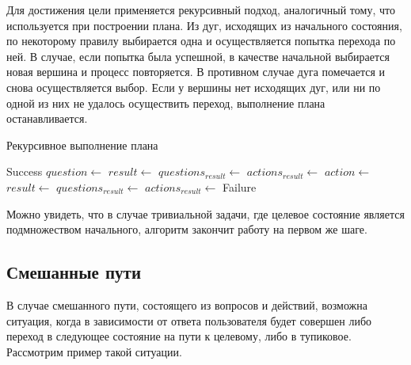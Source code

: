 Для достижения цели применяется рекурсивный подход, аналогичный тому, что используется при построении плана. Из дуг, исходящих из начального состояния, по некоторому правилу выбирается одна и осуществляется попытка перехода по ней. В случае, если попытка была успешной, в качестве начальной выбирается новая вершина и процесс повторяется. В противном случае дуга помечается и снова осуществляется выбор. Если у вершины нет исходящих дуг, или ни по одной из них не удалось осуществить переход, выполнение плана останавливается.

\begin{algorithm}
 \caption{Рекурсивное выполнение плана}
 \begin{algorithmic}
      \State \Return Success
    \EndIf
      \State $question \gets$ 
      \State $result \gets$ 
	\State $questions_{result} \gets$
	\State $actions_{result} \gets$
	\State {}
      \Else
	\State {}
      \EndIf
      \State $action \gets$ 
      \State $result \gets$ 
	\State $questions_{result} \gets$
	\State $actions_{result} \gets$
	\State {}
      \Else
	\State {}
      \EndIf
    \Else 
      \State \Return Failure
    \EndIf
  \EndFunction
 \end{algorithmic}
\end{algorithm}

Можно увидеть, что в случае тривиальной задачи, где целевое состояние является подмножеством начального, алгоритм закончит работу на первом же шаге.

\subsection{Смешанные пути}

В случае смешанного пути, состоящего из вопросов и действий, возможна ситуация, когда в зависимости от ответа пользователя будет совершен либо переход в следующее состояние на пути к целевому, либо в тупиковое. Рассмотрим пример такой ситуации.

